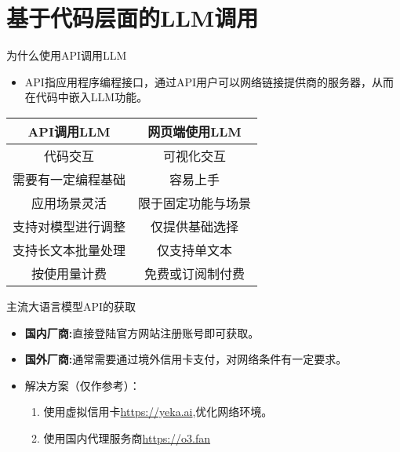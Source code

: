 \documentclass{beamer}
\begin{document}
\section{基于代码层面的LLM调用}
\begin{frame}{为什么使用API调用LLM}
    \begin{itemize}
        \item  API指应用程序编程接口，通过API用户可以网络链接提供商的服务器，从而在代码中嵌入LLM功能。
    \end{itemize}
    \begin{table}[h]
        \centering
        \begin{tabular}{c|c}
            API调用LLM & 网页端使用LLM \\
            \hline
            代码交互 & 可视化交互 \\
            需要有一定编程基础 & 容易上手 \\
            应用场景灵活 & 限于固定功能与场景 \\
            支持对模型进行调整 & 仅提供基础选择 \\
            支持长文本批量处理 & 仅支持单文本 \\
            按使用量计费 & 免费或订阅制付费 \\
        \end{tabular}
    \end{table}
\end{frame}

\begin{frame}{主流大语言模型API的获取}
    \begin{itemize}
        \item  \textbf{国内厂商:}直接登陆官方网站注册账号即可获取。
        \item  \textbf{国外厂商:}通常需要通过境外信用卡支付，对网络条件有一定要求。
        \item[] 解决方案（仅作参考）：
        \begin{enumerate}
            \item 使用虚拟信用卡\url{https://yeka.ai},优化网络环境。
            \item 使用国内代理服务商\url{https://o3.fan}
          \end{enumerate}
      \end{itemize}
\end{frame}
\end{document}
